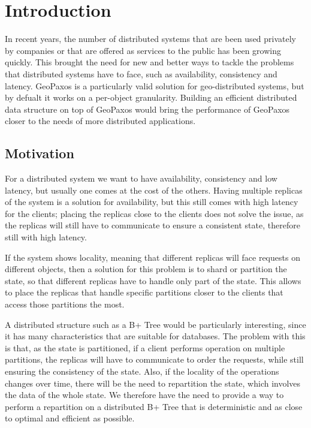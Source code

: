 \chapter{Introduction}\label{sec:introduction}
In recent years, the number of distributed systems that are been used privately by companies or that are offered as services to the public has been growing quickly. This brought the need for new and better ways to tackle the problems that distributed systems have to face, such as availability, consistency and latency. GeoPaxos is a particularly valid solution for geo-distributed systems, but by defualt it works on a per-object granularity. Building an efficient distributed data structure on top of GeoPaxos would bring the performance of GeoPaxos closer to the needs of more distributed applications.

\section{Motivation}\label{sec:motivation}
For a distributed system we want to have availability, consistency and low latency, but usually one comes at the cost of the others. Having multiple replicas of the system is a solution for availability, but this still comes with high latency for the clients; placing the replicas close to the clients does not solve the issue, as the replicas will still have to communicate to ensure a consistent state, therefore still with high latency.

If the system shows locality, meaning that different replicas will face requests on different objects, then a solution for this problem is to shard or partition the state, so that different replicas have to handle only part of the state. This allows to place the replicas that handle specific partitions closer to the clients that access those partitions the most.

A distributed structure such as a B+ Tree would be particularly interesting, since it has many characteristics that are suitable for databases. The problem with this is that, as the state is partitioned, if a client performs operation on multiple partitions, the replicas will have to communicate to order the requests, while still ensuring the consistency of the state. Also, if the locality of the operations changes over time, there will be the need to repartition the state, which involves the data of the whole state. We therefore have the need to provide a way to perform a repartition on a distributed B+ Tree that is deterministic and as close to optimal and efficient as possible.

